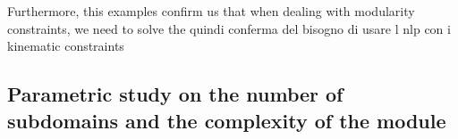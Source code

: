 \begin{figure}[]
    \hspace*{\fill}
    \hfill
    \hspace*{\fill}
    \caption{}
    \label{fig:05_cell_multi_eq}
\end{figure}
Furthermore, this examples confirm us that when dealing with modularity constraints, we need to solve the quindi conferma del bisogno di usare l nlp con i kinematic constraints

\subsection{Parametric study on the number of subdomains and the complexity of the module}

